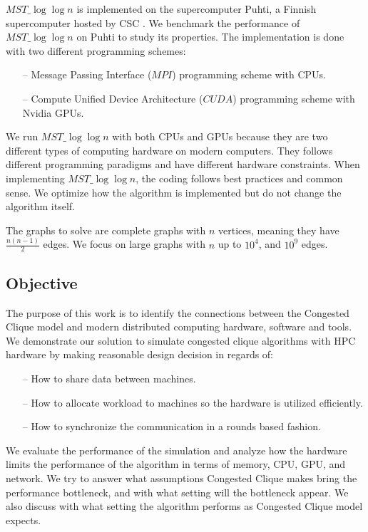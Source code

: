 \documentclass[english, 12pt, a4paper, elec, utf8, a-2b, online]{aaltothesis}
\newcommand{\mstalgo}{$MST\_\log\log{n}$}
\begin{document}
\mstalgo{} is implemented on the supercomputer Puhti, a Finnish supercomputer hosted by CSC \cite{Puhti}. We benchmark the performance of \mstalgo{} on Puhti to study its properties. The implementation is done with two different programming schemes:
\begin{itemize}
	\item[--] Message Passing Interface ($MPI$) programming scheme with CPUs.
	\item[--] Compute Unified Device Architecture ($CUDA$) programming scheme with Nvidia GPUs.
\end{itemize}

We run \mstalgo{} with both CPUs and GPUs because they are two different types of computing hardware on modern computers. They follows different programming paradigms and have different hardware constraints. When implementing \mstalgo{}, the coding follows best practices and common sense. We optimize how the algorithm is implemented but do not change the algorithm itself.

The graphs to solve are complete graphs with $n$ vertices, meaning they have $\frac{n(n-1)}{2}$ edges. We focus on large graphs with $n$ up to $10^4$, and $10^9$ edges.

\subsection{Objective}
The purpose of this work is to identify the connections between the Congested Clique model and modern distributed computing hardware, software and tools. We demonstrate our solution to simulate congested clique algorithms with HPC hardware by making reasonable design decision in regards of:
\begin{itemize}
	\item[--] How to share data between machines.
	\item[--] How to allocate workload to machines so the hardware is utilized efficiently.
	\item[--]	How to synchronize the communication in a rounds based fashion.
\end{itemize}
We evaluate the performance of the simulation and analyze how the hardware limits the performance of the algorithm in terms of memory, CPU, GPU, and network. We try to answer what assumptions Congested Clique makes bring the performance bottleneck, and with what setting will the bottleneck appear. We also discuss with what setting the algorithm performs as Congested Clique model expects.
\end{document}
